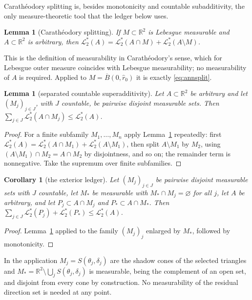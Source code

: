 \documentclass[11pt]{article}
\theoremstyle{plain}
\newtheorem{lemma}[theorem]{Lemma}
\newtheorem{corollary}[theorem]{Corollary}
\theoremstyle{definition}
\theoremstyle{remark}
\newcommand{\R}{\mathbb{R}}
\newcommand{\Lout}{\mathcal{L}^{*}_{2}}
\begin{document}
Carath\'eodory splitting is, besides monotonicity and countable subadditivity,
the only measure-theoretic tool that the ledger below uses.

\begin{lemma}[Carath\'eodory splitting]\label{lem:anncara}
If $M\subset\R^{2}$ is Lebesgue measurable and $A\subset\R^{2}$ is arbitrary,
then $\Lout(A)=\Lout(A\cap M)+\Lout(A\setminus M)$.
\end{lemma}

This is the definition of measurability in Carath\'eodory's sense, which for
Lebesgue outer measure coincides with Lebesgue measurability; no measurability
of $A$ is required. Applied to $M=\overline B(0,\hat r_{0})$ it is exactly
\eqref{eq:annsplit}.

\begin{lemma}[separated countable superadditivity]\label{lem:annsuper}
Let $A\subset\R^{2}$ be arbitrary and let $(M_{j})_{j\in J}$, with $J$
countable, be pairwise disjoint measurable sets. Then
$\sum_{j\in J}\Lout(A\cap M_{j})\le\Lout(A)$.
\end{lemma}

\begin{proof}
For a finite subfamily $M_{1},\dots,M_{n}$ apply Lemma~\ref{lem:anncara}
repeatedly: first $\Lout(A)=\Lout(A\cap M_{1})+\Lout(A\setminus M_{1})$, then
split $A\setminus M_{1}$ by $M_{2}$, using
$(A\setminus M_{1})\cap M_{2}=A\cap M_{2}$ by disjointness, and so on; the
remainder term is nonnegative. Take the supremum over finite subfamilies.
\end{proof}

\begin{corollary}[the exterior ledger]\label{cor:annledger}
Let $(M_{j})_{j\in J}$ be pairwise disjoint measurable sets with $J$ countable,
let $M_{*}$ be measurable with $M_{*}\cap M_{j}=\varnothing$ for all $j$, let
$A$ be arbitrary, and let $P_{j}\subset A\cap M_{j}$ and
$P_{*}\subset A\cap M_{*}$. Then
$\sum_{j\in J}\Lout(P_{j})+\Lout(P_{*})\le\Lout(A)$.
\end{corollary}

\begin{proof}
Lemma~\ref{lem:annsuper} applied to the family $(M_{j})_{j}$ enlarged by
$M_{*}$, followed by monotonicity.
\end{proof}

In the application $M_{j}=S(\theta_{j},\delta_{j})$ are the shadow cones of the
selected triangles and
$M_{*}=\R^{2}\setminus\bigcup_{j}S(\theta_{j},\delta_{j})$ is measurable, being
the complement of an open set, and disjoint from every cone by construction. No
measurability of the residual direction set is needed at any point.
\end{document}
